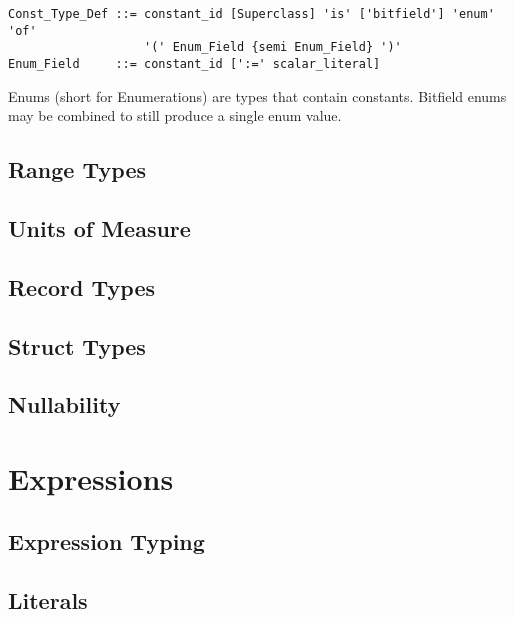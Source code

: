 \syntax\begin{lstlisting}
Const_Type_Def ::= constant_id [Superclass] 'is' ['bitfield'] 'enum' 'of'
                   '(' Enum_Field {semi Enum_Field} ')'
Enum_Field     ::= constant_id [':=' scalar_literal]
\end{lstlisting}


Enums (short for Enumerations) are types that contain constants. Bitfield enums may be combined to still produce a single enum value. 

\section{Range Types}
\label{sec:range-types}



\section{Units of Measure}
\label{sec:units-of-measure}

\section{Record Types}
\label{sec:record-types}

\section{Struct Types}
\label{sec:struct-types}

\section{Nullability}
\label{sec:nullability}

\chapter{Expressions}

\section{Expression Typing}

\section{Literals}

